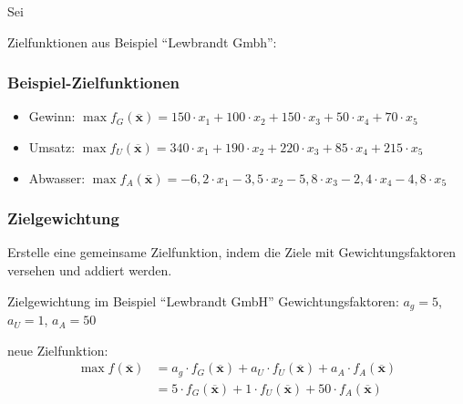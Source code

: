 Sei\begin{frame}
 Zielfunktionen aus Beispiel "`Lewbrandt Gmbh"':
 \frametitle{Beispiel-Zielfunktionen}
 \begin{itemize}
  \item Gewinn: $\max f_G(\mathbf{\overline{x}}) = 150\cdot x_1 + 100\cdot x_2 + 150\cdot x_3 + 50\cdot x_4 + 70\cdot x_5$
  \item Umsatz: $\max f_U(\mathbf{\overline{x}}) = 340\cdot x_1 + 190\cdot x_2 + 220\cdot x_3 + 85\cdot x_4 + 215\cdot x_5$
  \item Abwasser: $\max f_A(\mathbf{\overline{x}}) = -6,2\cdot x_1 - 3,5\cdot x_2 - 5,8\cdot x_3 - 2,4\cdot x_4 - 4,8\cdot x_5$
 \end{itemize}
\end{frame}

\begin{frame}
 \frametitle{Zielgewichtung}
 Erstelle \alert{eine} gemeinsame Zielfunktion, indem die Ziele mit Gewichtungsfaktoren versehen und addiert werden.
 
 \begin{block}{Zielgewichtung im Beispiel "`Lewbrandt GmbH"'}
  Gewichtungsfaktoren: $a_g=5$, $a_U=1$, $a_A=50$\par
  neue Zielfunktion: 
  \[
  \begin{split}
  \max f(\mathbf{\overline{x}}) &= a_g\cdot f_G(\mathbf{\overline{x}}) + a_U\cdot f_U(\mathbf{\overline{x}})+a_A\cdot f_A(\mathbf{\overline{x}})\\
  &=5\cdot f_G(\mathbf{\overline{x}}) + 1\cdot f_U(\mathbf{\overline{x}})+50\cdot f_A(\mathbf{\overline{x}})
  \end{split}
  \]
 \end{block}
\end{frame}

